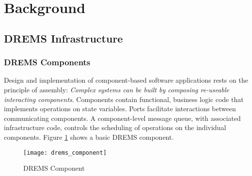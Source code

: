 \section{Background}
\label{sec:Background}

\subsection{DREMS Infrastructure}


\subsubsection{DREMS Components}
\label{sec:drems_component}
Design and implementation of component-based software applications rests on the principle of assembly: \textit{Complex systems can be built by composing re-useable interacting components}. Components contain functional, business logic code that implements operations on state variables. Ports facilitate interactions between communicating components. A component-level message queue, with associated infrastructure code, controls the scheduling of operations on the individual components. Figure \ref{fig:drems_component} shows a basic DREMS component.  

\begin{figure}[ht]
\centering
\texttt{[image: drems\_component]}
\caption{DREMS Component}
\label{fig:drems_component}
\vspace{-0.2in}
\end{figure}
\vspace{0.1in}

